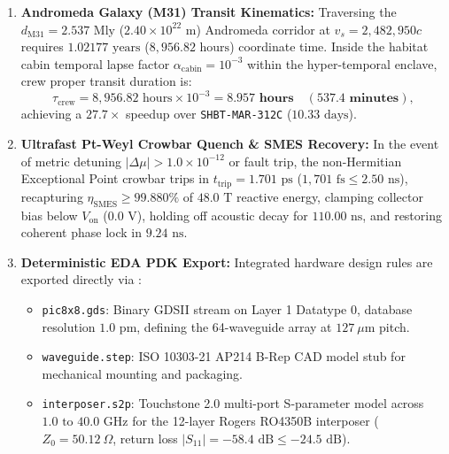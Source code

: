 \documentclass[11pt,onecolumn]{article}
\begin{document}
\begin{enumerate}
\begin{equation}
    a_{\text{res}} \le \mathbf{1.0 \times 10^{-7}\text{ m/s}^2} \ll 1.0 \times 10^{-6}\text{ m/s}^2.
    \end{equation}
    The resulting macroscopic shift-vector soliton $\beta^x(t, \mathbf{x})$ is:
    \begin{equation}
    \beta^x(t, \mathbf{x}) = -v_s(t) \cdot \mathcal{C}(\sigma_\phi) \cdot \exp\left(\frac{1}{2}\Delta_{\text{mod}}(P_{\text{act}})\right) f_{\text{SHBT}}(\mathbf{x}),
    \end{equation}
    governing the four operational flight tiers: Tier 1 Cruise ($v_s = 99.3c$), Tier 2 Burst ($v_s = 754.9c$), Tier 3 Impulse ($v_s = 99{,}308c$), and Tier 4 Hyper-Impulse ($v_s = 2{,}482{,}950c$).
    \item \textbf{Andromeda Galaxy (M31) Transit Kinematics:} Traversing the $d_{\text{M31}} = 2.537\text{ Mly}$ ($2.40 \times 10^{22}\text{ m}$) Andromeda corridor at $v_s = 2{,}482{,}950c$ requires $1.02177\text{ years}$ ($8{,}956.82\text{ hours}$) coordinate time. Inside the habitat cabin temporal lapse factor $\alpha_{\text{cabin}} = 10^{-3}$ within the hyper-temporal enclave, crew proper transit duration is:
    \begin{equation}
    \tau_{\text{crew}} = 8{,}956.82\text{ hours} \times 10^{-3} = \mathbf{8.957\text{ hours}} \quad (\mathbf{537.4\text{ minutes}}),
    \end{equation}
    achieving a $27.7\times$ speedup over \texttt{SHBT-MAR-312C} ($10.33\text{ days}$).
    \item \textbf{Ultrafast Pt-Weyl Crowbar Quench \& SMES Recovery:} In the event of metric detuning $|\Delta\mu| > 1.0 \times 10^{-12}$ or fault trip, the non-Hermitian Exceptional Point crowbar trips in $t_{\text{trip}} = 1.701\text{ ps}$ ($1{,}701\text{ fs} \le 2.50\text{ ns}$), recapturing $\eta_{\text{SMES}} \ge 99.880\%$ of $48.0\text{ T}$ reactive energy, clamping collector bias below $V_{\text{on}}$ ($0.0\text{ V}$), holding off acoustic decay for $110.00\text{ ns}$, and restoring coherent phase lock in $9.24\text{ ns}$.
    \item \textbf{Deterministic EDA PDK Export:} Integrated hardware design rules are exported directly via :
    \begin{itemize}
        \item \texttt{pic8x8.gds}: Binary GDSII stream on Layer 1 Datatype 0, database resolution $1.0\text{ pm}$, defining the 64-waveguide array at $127\ \mu\text{m}$ pitch.
        \item \texttt{waveguide.step}: ISO 10303-21 AP214 B-Rep CAD model stub for mechanical mounting and packaging.
        \item \texttt{interposer.s2p}: Touchstone 2.0 multi-port S-parameter model across $1.0\text{ to } 40.0\text{ GHz}$ for the 12-layer Rogers RO4350B interposer ($Z_0 = 50.12\ \Omega$, return loss $|S_{11}| = -58.4\text{ dB} \le -24.5\text{ dB}$).
    \end{itemize}
\end{enumerate}
\end{document}
